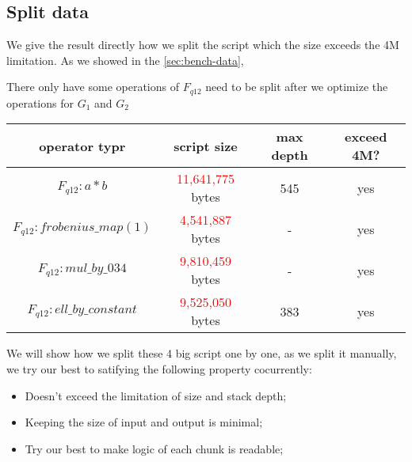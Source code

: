 \subsection{Split data} \label{sec:split-data}

We give the result directly how we split the script which the size exceeds the 4M limitation. As we showed in the \ref{sec:bench-data},

There only have some operations of $F_{q12}$ need to be split after we optimize the operations for $G_1$ and $G_2$

\begin{center}
\begin{tabular}{|c|c|c|c|} \hline
    operator typr & script size & max depth & exceed 4M? \\ \hline
    $F_{q12}: a * b$ & \textcolor{red}{11,641,775} bytes & 545 & yes \\ \hline
    $F_{q12}: frobenius\_map(1)$ & \textcolor{red}{4,541,887} bytes & - & yes \\ \hline
    $F_{q12}: mul\_by\_034$ & \textcolor{red}{9,810,459} bytes & - & yes \\ \hline
    $F_{q12}: ell\_by\_constant$ & \textcolor{red}{9,525,050} bytes & 383 & yes \\ \hline    
\end{tabular}
\end{center}


We will show how we split these 4 big script one by one, as we split it manually, we try our best to satifying the following property cocurrently:

\begin{itemize}
    \item Doesn't exceed the limitation of size and stack depth;
    \item Keeping the size of input and output is minimal;
    \item Try our best to make logic of each chunk is readable; 
\end{itemize}



